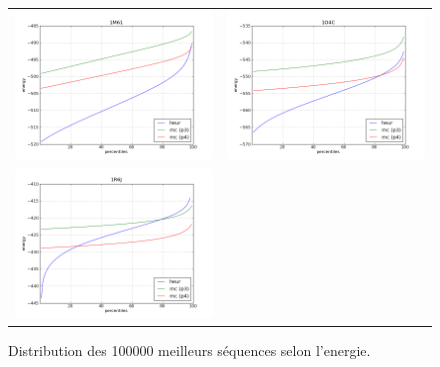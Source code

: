 \documentclass[a4paper,12pt]{article}
\begin{document}
\begin{figure}[t]
\begin{tabular}{cc}
       \includegraphics[width=8.45cm]{images/1M61_centiles.png} &
       \includegraphics[width=8.45cm]{images/1O4C_centiles.png} \\
       \includegraphics[width=8.45cm]{images/1R6J_centiles.png} \\
     \end{tabular}
     
     \caption{Distribution des 100000 meilleurs séquences selon l'energie.}
     \label{fig-seqlogo-T=03}
   \end{figure}


 
\end{document}
